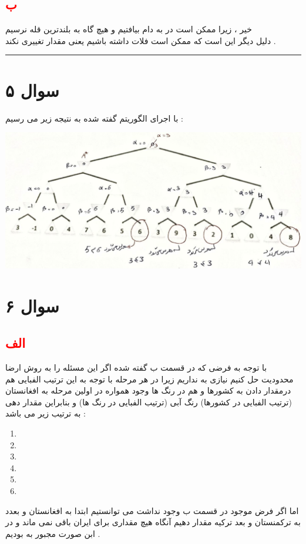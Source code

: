 \documentclass{article}
\begin{document}
\subsection*{\textcolor{red}{ب}}
خیر ، زیرا ممکن است در 
به دام بیافتیم و هیچ گاه به بلندترین قله نرسیم 
\\
دلیل دیگر این است که ممکن است فلات داشته باشیم یعنی مقدار 
تغییری نکند  . 
\hrule
\section*{سوال ۵ }
با اجرای الگوریتم گفته شده به نتیجه زیر می رسیم : 
\begin{center}
	\includegraphics[width=1.1\textwidth]{q5p1}
\end{center}
\section*{سوال ۶}
\subsection*{\textcolor{red}{الف}}
با توجه به فرضی که در قسمت ب گفته شده اگر این مسئله را به روش ارضا محدودیت حل کنیم نیازی به 
نداریم زیرا در هر مرحله با توجه به این ترتیب الفبایی هم درمقدار دادن به کشورها و هم در رنگ ها وجود همواره در اولین مرحله به افغانستان (ترتیب الفبایی در کشورها) رنگ آبی (ترتیب الفبایی در رنگ ها) و بنابراین مقدار دهی به ترتیب زیر می باشد  : 
\begin{center}
	\begin{enumerate}
		\item {}
		\item {}
		\item {}
		\item {}
		\item {}
		\item {}
	\end{enumerate}
\end{center}
اما اگر فرض موجود در قسمت ب وجود نداشت می توانستیم ابتدا به افغانستان  و بعدد به ترکمنستان و بعد ترکیه مقدار دهیم آنگاه هیچ مقداری برای ایران باقی نمی ماند و در ابن صورت مجبور به 
بودیم  . 
\end{document}
